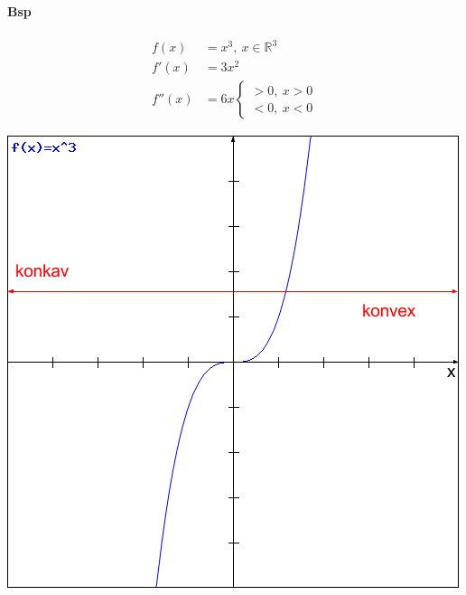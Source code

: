\documentclass{article}
\begin{document}
\paragraph{Bsp}
\begin{align*}
	f(x)&=x^3 , \ x \in \mathbb{R}^3 
	\\
	f'(x)&=3x^2
	\\	
	f''(x)&=6x \left\{ 
		\begin{array}{c} 
			> 0, \ x > 0
			\\
			< 0, \ x < 0
		\end{array} 
	\right.
\end{align*}
\begin{center}
	\includegraphics[scale=0.5]{png/konkav_konvex.png}
\end{center}
\end{document}

